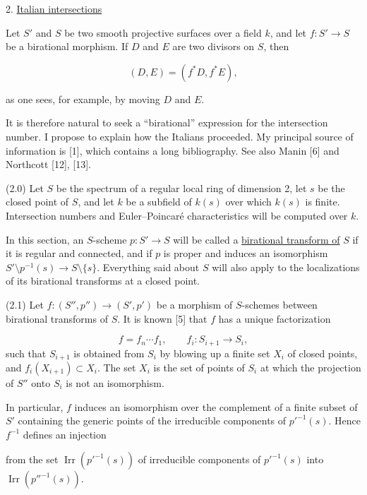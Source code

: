2. \underline{Italian intersections}

Let $S'$ and $S$ be two smooth projective surfaces over a field $k$, and let
$f:S'\longrightarrow S$ be a birational morphism.  If $D$ and $E$ are two
divisors on $S$, then

\begin{equation*}
(D,E)=(f^*D,f^*E),
\end{equation*}


as one sees, for example, by moving $D$ and $E$.

It is therefore natural to seek a ``birational'' expression for the intersection
number.  I propose to explain how the Italians proceeded.  My principal source
of information is [1], which contains a long bibliography.  See also Manin [6]
and Northcott [12], [13].

(2.0) Let $S$ be the spectrum of a regular local ring of dimension 2, let $s$ be
the closed point of $S$, and let $k$ be a subfield of $k(s)$ over which $k(s)$ is
finite.  Intersection numbers and Euler--Poincaré characteristics will be
computed over $k$.

In this section, an $S$-scheme $p:S'\longrightarrow S$ will be called a
\underline{birational transform of} $S$ if it is regular and connected, and if
$p$ is proper and induces an isomorphism
$S'\setminus p^{-1}(s)\longrightarrow S\setminus\{s\}$.  Everything said about
$S$ will also apply to the localizations of its birational transforms at a
closed point.

(2.1) Let $f:(S'',p'')\longrightarrow(S',p')$ be a morphism of $S$-schemes
between birational transforms of $S$.  It is known [5] that $f$ has a unique
factorization

\begin{equation*}
f=f_n\cdots f_1,\qquad f_i:S_{i+1}\longrightarrow S_i,
\end{equation*}
such that $S_{i+1}$ is obtained from $S_i$ by blowing up a finite set $X_i$ of
closed points, and $f_i(X_{i+1})\subset X_i$.  The set $X_i$ is the set of points
of $S_i$ at which the projection of $S''$ onto $S_i$ is not an isomorphism.

In particular, $f$ induces an isomorphism over the complement of a finite subset
of $S'$ containing the generic points of the irreducible components of
$p'^{-1}(s)$.  Hence $f^{-1}$ defines an injection


from the set $\operatorname{Irr}(p'^{-1}(s))$ of irreducible components of
$p'^{-1}(s)$ into $\operatorname{Irr}(p''^{-1}(s))$.

